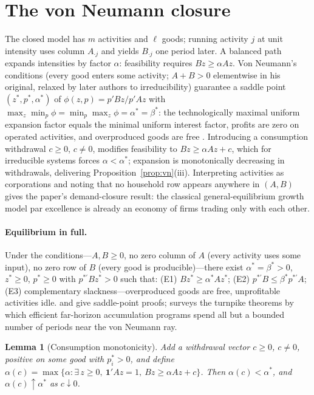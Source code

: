\documentclass[11pt]{article}
\newtheorem{lemma}{Lemma}
\begin{document}
\appendix

\section{The von Neumann closure}\label{app:vn}

The closed model has $m$ activities and $\ell$ goods; running activity $j$ at unit intensity uses column $A_{\cdot j}$ and yields $B_{\cdot j}$ one period later. A balanced path expands intensities by factor $\alpha$: feasibility requires $Bz \ge \alpha Az$. Von Neumann's conditions (every good enters some activity; $A+B > 0$ elementwise in his original, relaxed by later authors to irreducibility) guarantee a saddle point $(z^{*},p^{*},\alpha^{*})$ of $\phi(z,p)=p'Bz/p'Az$ with $\max_z \min_p \phi = \min_p \max_z \phi = \alpha^{*} = \beta^{*}$: the technologically maximal uniform expansion factor equals the minimal uniform interest factor, profits are zero on operated activities, and overproduced goods are free \citep{vonneumann1945,dorfman1958}. Introducing a consumption withdrawal $c \ge 0$, $c \ne 0$, modifies feasibility to $Bz \ge \alpha Az + c$, which for irreducible systems forces $\alpha < \alpha^{*}$; expansion is monotonically decreasing in withdrawals, delivering Proposition~\ref{prop:vn}(iii). Interpreting activities as corporations and noting that no household row appears anywhere in $(A,B)$ gives the paper's demand-closure result: the classical general-equilibrium growth model par excellence is already an economy of firms trading only with each other.

\paragraph{Equilibrium in full.} Under the \citet{kemeny1956} conditions---$A,B\ge 0$, no zero column of $A$ (every activity uses some input), no zero row of $B$ (every good is producible)---there exist $\alpha^{*}=\beta^{*}>0$, $z^{*}\ge 0$, $p^{*}\ge 0$ with $p^{*\prime}Bz^{*}>0$ such that: (E1) $Bz^{*} \ge \alpha^{*}Az^{*}$; (E2) $p^{*\prime}B \le \beta^{*}p^{*\prime}A$; (E3) complementary slackness---overproduced goods are free, unprofitable activities idle. \citet{gale1956} and \citet{dorfman1958} give saddle-point proofs; \citet{mckenzie1976} surveys the turnpike theorems by which efficient far-horizon accumulation programs spend all but a bounded number of periods near the von Neumann ray.

\begin{lemma}[Consumption monotonicity]\label{lem:vnmono}
Add a withdrawal vector $c\ge 0$, $c\ne 0$, positive on some good with $p^{*}_i>0$, and define $\alpha(c) = \max\{\alpha : \exists\, z \ge 0,\ \mathbf{1}'Az = 1,\ Bz \ge \alpha Az + c\}$. Then $\alpha(c) < \alpha^{*}$, and $\alpha(c) \uparrow \alpha^{*}$ as $c \downarrow 0$.
\end{lemma}
\end{document}
